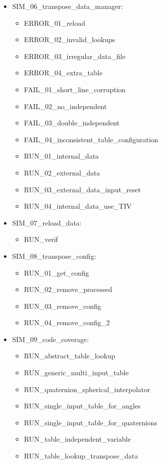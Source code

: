 \documentclass[11pt,fleqn]{report}
\begin{document}
\begin{itemize}
  \item SIM\_06\_transpose\_data\_manager:
  \begin{itemize}
    \item ERROR\_01\_reload
    \item ERROR\_02\_invalid\_lookups
    \item ERROR\_03\_irregular\_data\_file
    \item ERROR\_04\_extra\_table
    \item FAIL\_01\_short\_line\_corruption
    \item FAIL\_02\_no\_independent
    \item FAIL\_03\_double\_independent
    \item FAIL\_04\_inconsistent\_table\_configuration
    \item RUN\_01\_internal\_data
    \item RUN\_02\_external\_data
    \item RUN\_03\_external\_data\_input\_reset
    \item RUN\_04\_internal\_data\_use\_TIV
  \end{itemize}

  \item SIM\_07\_reload\_data:
  \begin{itemize}
    \item RUN\_verif
  \end{itemize}

  \item SIM\_08\_transpose\_config:
  \begin{itemize}
    \item RUN\_01\_get\_config
    \item RUN\_02\_remove\_processed
    \item RUN\_03\_remove\_config
    \item RUN\_04\_remove\_config\_2
  \end{itemize}

  \item SIM\_09\_code\_coverage:
  \begin{itemize}
    \item RUN\_abstract\_table\_lookup
    \item RUN\_generic\_multi\_input\_table
    \item RUN\_quaternion\_spherical\_interpolator
    \item RUN\_single\_input\_table\_for\_angles
    \item RUN\_single\_input\_table\_for\_quaternions
    \item RUN\_table\_independent\_variable
    \item RUN\_table\_lookup\_transpose\_data
  \end{itemize}


\end{itemize}
\end{document}
